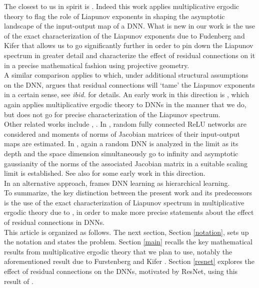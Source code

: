 \documentclass[12pt]{amsart}
\theoremstyle{plain}
\theoremstyle{definition}
\theoremstyle{remark}
\newcommand{\0}{\textbf{0}}
\begin{document}
The closest to us in spirit is \cite{Storm}. Indeed this work applies multiplicative ergodic theory to flag the role of Liapunov exponents in shaping the asymptotic landscape of the input-output map of a DNN. What is new in our work is  the use of the exact characterization of the Liapunov exponents due to Fudenberg and Kifer \cite{FK} that allows us to go significantly further in order to pin down the Liapunov spectrum in greater detail and characterize the effect of residual connections on it in a precise mathematical fashion using projective geometry. \\

A similar comparison applies to \cite{Chen} which, under additional structural assumptions on the DNN, argues that residual connections will `tame' the Liapunov exponents in a certain sense, see \textit{ibid.} for details. An early work in this direction is \cite{Avelin}, which again applies multiplicative ergodic theory to DNNs in the manner that we do, but does not go for precise characterization of the Liapunov spectrum.\\

Other related works include \cite{Hanin1}, \cite{Hanin2}. In \cite{Hanin1}, random fully connected ReLU networks are considered and moments of norms of  Jacobian matrices of their input-output maps are estimated. In \cite{Hanin2}, again a random DNN is analyzed in the limit as its depth and the space dimension simultaneously go to infinity and asymptotic gaussianity of the norms  of the associated Jacobian matrix in a suitable scaling limit is established. See also \cite{Zhang} for some early work in this direction.\\ 

In an alternative approach, \cite{Allen-Zhu} frames DNN learning as hierarchical learning.\\

To summarize, the key distinction between the present work and its predecessors is the use of  the exact characterization of  Liapunov spectrum in multiplicative ergodic theory due to \cite{FK}, in order to make more precise statements about the effect of residual connections in DNNs.\\

This article is organized as follows. The next section, Section \ref{notation}, sets up the notation and states the problem. Section \ref{main}  recalls the key mathematical results from multiplicative ergodic theory that we plan to use, notably the aforementioned result due to Furstenberg and Kifer \cite{FK}.  Section \ref{resnet} explores the effect of residual connections on the DNNs, motivated by ResNet, using this result of \cite{FK}. \\
\end{document}
